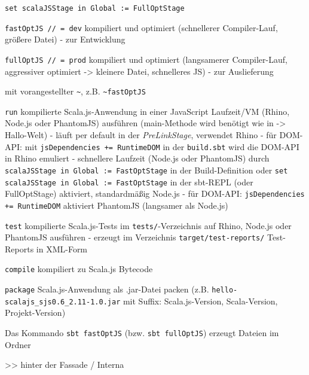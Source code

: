 \documentclass[a4paper, 12pt, hidelinks, listof=totoc, listoftables=totoc, bibliography=totoc]{scrreprt}
\begin{document}
\texttt{set scalaJSStage in Global := FullOptStage}


\texttt{fastOptJS // = dev} kompiliert und optimiert (schnellerer Compiler-Lauf, größere Datei) - zur Entwicklung

\texttt{fullOptJS // = prod} kompiliert und optimiert (langsamerer Compiler-Lauf, aggressiver optimiert -> kleinere Datei, schnelleres JS) - zur Auslieferung

mit vorangestellter  \texttt{\textasciitilde{}}, z.B. \texttt{\textasciitilde{}fastOptJS}

\texttt{run} kompilierte Scala.js-Anwendung in einer JavaScript Laufzeit/VM (Rhino, Node.js oder PhantomJS) ausführen (main-Methode wird benötigt wie in -> Hallo-Welt)
	- läuft per default in der \textit{PreLinkStage}, verwendet Rhino
		- für DOM-API: mit \texttt{jsDependencies += RuntimeDOM} in der \texttt{build.sbt} wird die DOM-API in Rhino emuliert
	- schnellere Laufzeit (Node.js oder PhantomJS) durch \texttt{scalaJSStage in Global := FastOptStage} in der Build-Definition oder \texttt{set scalaJSStage in Global := FastOptStage} in der sbt-REPL (oder FullOptStage) aktiviert, standardmäßig Node.js
		- für DOM-API: \texttt{jsDependencies += RuntimeDOM} aktiviert PhantomJS (langsamer als Node.js)

\texttt{test} kompilierte Scala.js-Tests im \texttt{tests/}-Verzeichnis auf Rhino, Node.js oder PhantomJS ausführen
	- erzeugt im Verzeichnis \texttt{target/test-reports/} Test-Reports in XML-Form

\texttt{compile} kompiliert zu Scala.js Bytecode

\texttt{package} Scala.js-Anwendung als .jar-Datei packen (z.B. \texttt{hello-scalajs\_sjs0.6\_2.11-1.0.jar} mit Suffix: Scala.js-Version, Scala-Version, Projekt-Version)






Das Kommando \texttt{sbt fastOptJS} (bzw. \texttt{sbt fullOptJS}) erzeugt Dateien im Ordner












>> hinter der Fassade / Interna
\end{document}
